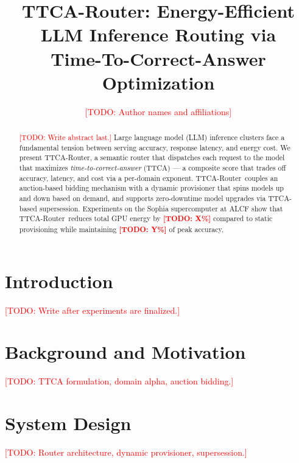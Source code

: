 \documentclass[11pt]{article}
\newcommand{\sysname}{TTCA-Router\xspace}
\newcommand{\ttca}{\textsc{TTCA}\xspace}
\newcommand{\result}[1]{\textbf{#1}}
\newcommand{\todo}[1]{\textcolor{red}{[TODO: #1]}}
\begin{document}
\title{\sysname: Energy-Efficient LLM Inference Routing via\\
       Time-To-Correct-Answer Optimization}

\author{
  \todo{Author names and affiliations}
}

\date{}
\maketitle

\begin{abstract}
\todo{Write abstract last.}
Large language model (LLM) inference clusters face a fundamental
tension between serving accuracy, response latency, and energy cost.
We present \sysname, a semantic router that dispatches each request
to the model that maximizes \emph{time-to-correct-answer} (\ttca)
— a composite score that trades off accuracy, latency, and cost via
a per-domain exponent.  \sysname\ couples an auction-based bidding
mechanism with a dynamic provisioner that spins models up and down
based on demand, and supports zero-downtime model upgrades via
\ttca-based supersession.  Experiments on the Sophia supercomputer
at ALCF show that \sysname\ reduces total GPU energy by
\result{\todo{X\%}} compared to static provisioning while maintaining
\result{\todo{Y\%}} of peak accuracy.
\end{abstract}

\section{Introduction}
\label{sec:intro}
\todo{Write after experiments are finalized.}

\section{Background and Motivation}
\label{sec:background}
\todo{TTCA formulation, domain alpha, auction bidding.}

\section{System Design}
\label{sec:design}
\todo{Router architecture, dynamic provisioner, supersession.}
\end{document}
